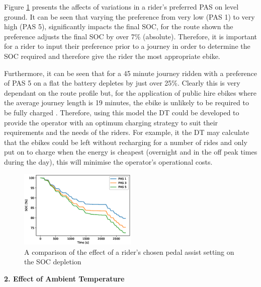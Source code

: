\documentclass[a4paper, 10pt]{article}
\numberwithin{equation}{section}
\begin{document}
Figure \ref{fig:eval_pas} presents the affects of variations in a rider's preferred PAS on level ground. It can be seen that varying the preference from very low (PAS 1) to very high (PAS 5), significantly impacts the final SOC, for the route shown the preference adjusts the final SOC by over 7\% (absolute). Therefore, it is important for a rider to input their preference prior to a journey in order to determine the SOC required and therefore give the rider the most appropriate ebike.

Furthermore, it can be seen that for a 45 minute journey ridden with a preference of PAS 5 on a flat the battery depletes by just over 25\%. Clearly this is very dependant on the route profile but, for the application of public hire ebikes where the average journey length is 19 minutes, the ebike is unlikely to be required to be fully charged \cite{tfl} . Therefore, using this model the DT could be developed to provide the operator with an optimum charging strategy to suit their requirements and the needs of the riders. For example, it the DT may calculate that the ebikes could be left without recharging for a number of rides and only put on to charge when the energy is cheapest (overnight and in the off peak times during the day), this will minimise the operator's operational costs.

\begin{figure}[H]
    \centering
    \includegraphics[width=0.5\textwidth]{images/eval_pas.eps}
    \caption{A comparison of the effect of a rider's chosen pedal assist setting on the SOC depletion}
    \label{fig:eval_pas}
\end{figure}



\textbf{2. Effect of Ambient Temperature}
\end{document}
